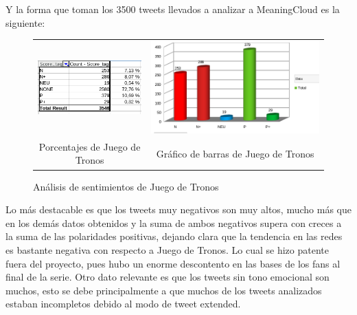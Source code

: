 Y la forma que toman los 3500 tweets llevados a analizar a MeaningCloud es la siguiente:

\begin{figure}[H]
	\centering
	\begin{tabular}{c c}
		
		\includegraphics[scale=.6]{imagenes/porcentajeJdT.png}
		&  \includegraphics[scale=.4]{imagenes/barraJdt.png} \\ 
		
		{Porcentajes de Juego de Tronos}
		
		&  {Gráfico de barras de Juego de Tronos} \\ 
		
	\end{tabular} 
	\caption{Análisis de sentimientos de Juego de Tronos}
	\label{fig:HBOAll}
\end{figure}

Lo más destacable es que los tweets muy negativos son muy altos, mucho más que en los demás datos obtenidos y la suma de ambos negativos supera con creces a la suma de las polaridades positivas, dejando clara que la tendencia en las redes es bastante negativa con respecto a Juego de Tronos. Lo cual se hizo patente fuera del proyecto, pues hubo un enorme descontento en las bases de los fans al final de la serie. Otro dato relevante es que los tweets sin tono emocional son muchos, esto se debe principalmente a que muchos de los tweets analizados estaban incompletos debido al modo de tweet extended. 
